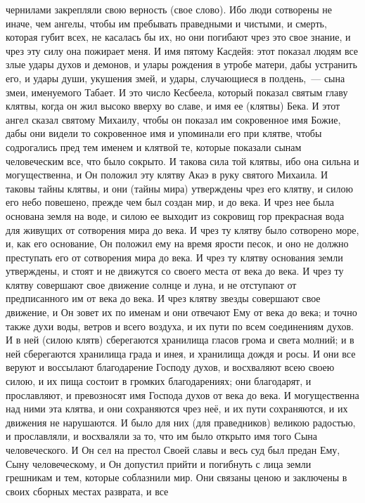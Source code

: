чернилами закрепляли свою верность (свое слово).
Ибо люди сотворены не иначе, чем ангелы, чтобы им пребывать праведными
и чистыми, и смерть, которая губит всех, не касалась бы их, но они погибают
чрез это свое знание, и чрез эту силу она пожирает меня.
И имя пятому Касдейя: этот показал людям все злые удары духов и
демонов, и улары рождения в утробе матери, дабы устранить его, и удары души,
укушения змей, и удары, случающиеся в полдень,~--- сына змеи, именуемого Табает.
И это число Кесбеела, который показал святым главу клятвы, когда он
жил высоко вверху во славе, и имя ее (клятвы) Бека.
И этот ангел сказал святому Михаилу, чтобы он показал им сокровенное
имя Божие, дабы они видели то сокровенное имя и упоминали его при клятве, чтобы
содрогались пред тем именем и клятвой те, которые показали сынам человеческим
все, что было сокрыто.
И такова сила той клятвы, ибо она сильна и могущественна, и Он положил
эту клятву Акаэ в руку святого Михаила.
И таковы тайны клятвы, и они (тайны мира) утверждены чрез его клятву,
и силою его небо повешено, прежде чем был создан мир, и до века.
И чрез нее была основана земля на воде, и силою ее
выходит из сокровищ гор прекрасная вода для живущих от сотворения мира
до века.
И чрез ту клятву было сотворено море, и, как его основание, Он положил
ему на время ярости песок, и оно не должно преступать его от сотворения мира до
века.
И чрез ту клятву основания земли утверждены, и стоят и не движутся со
своего места от века до века.
И чрез ту клятву совершают свое движение солнце и луна, и не отступают
от предписанного им от века до века.
И чрез клятву звезды совершают свое движение, и Он зовет их по именам
и они отвечают Ему от века до века; и точно также духи воды, ветров и всего
воздуха, и их пути по всем соединениям духов.
И в ней (силою клятв) сберегаются хранилища гласов грома и света
молний; и в ней сберегаются хранилища града и инея, и хранилища дождя и росы.
И они все веруют и воссылают благодарение Господу духов, и восхваляют
всею своею силою, и их пища состоит в громких благодарениях; они благодарят, и
прославляют, и превозносят имя Господа духов от века до века.
И могущественна над ними эта клятва, и они сохраняются чрез неё, и их
пути сохраняются, и их движения не нарушаются.
И было для них (для праведников) великою радостью, и прославляли, и
восхваляли за то, что им было открыто имя того Сына человеческого.
И Он сел на престол Своей славы и весь суд был предан Ему, Сыну
человеческому, и Он допустил прийти и погибнуть с лица земли грешникам и тем,
которые соблазнили мир.
Они связаны ценою и заключены в своих сборных местах разврата, и все
